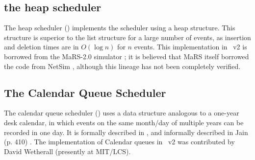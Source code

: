 \subsection{the heap scheduler}
\label{sec:heapsched}

The heap scheduler ()
implements the scheduler using a heap structure.
This structure is superior to the list structure for a large number
of events, as insertion and deletion times are in $O(\log n)$
for $n$ events.
This implementation in \ns~v2 is borrowed from the
MaRS-2.0 simulator \cite{Alae94:Design};
it is believed that MaRS itself borrowed the code
from NetSim \cite{Heyb89:Netsim},
although this lineage has not been completely verified.

\subsection{The Calendar Queue Scheduler}
\label{sec:cqsched}

The calendar queue scheduler
()
uses a data structure analogous to a one-year desk calendar,
in which events on the same month/day of multiple years can be recorded in
one day.
It is formally described in \cite{Brow88:Calendar}, and informally described
in Jain (p. 410) \cite{Jain91:Art}.
The implementation of Calendar queues in \ns~v2
was contributed by David Wetherall (presently at MIT/LCS).

